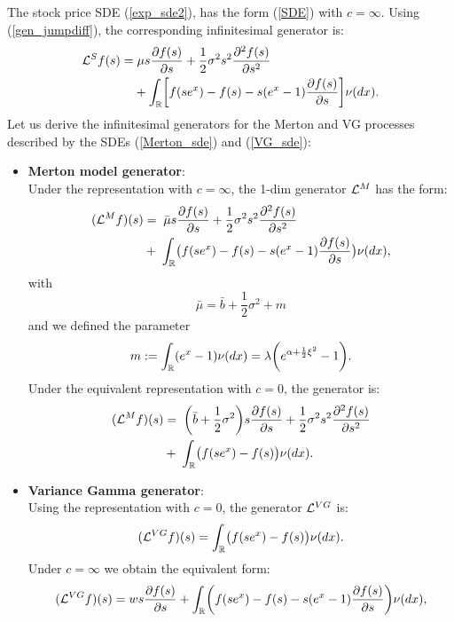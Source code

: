 The stock price SDE (\ref{exp_sde2}), has the form (\ref{SDE}) with $c=\infty$. Using (\ref{gen_jumpdiff}), the corresponding infinitesimal generator is:
\begin{align}\label{inf_gen_exp_levy}
 \mathcal{L}^S f(s) =& \; \mu s \frac{\partial f(s)}{\partial s}
+ \frac{1}{2} \sigma^2 s^2 \frac{\partial^2  f(s)}{\partial s^2}  \\ \nonumber
&+ \int_{\mathbb{R}} \biggl[ f(se^x) - f(s) - s(e^x-1)\frac{\partial f(s)}{\partial s} \biggr] \nu(dx).
\end{align}
Let us derive the infinitesimal generators for 
the Merton and VG processes described by the SDEs (\ref{Merton_sde}) and (\ref{VG_sde}): \\
\begin{itemize}
 \item \textbf{Merton model generator}:\\
 Under the representation with $c=\infty$, the 1-dim generator $\mathcal{L}^{M}$ has the form:  
 \begin{align}\label{Merton_gen}
  (\mathcal{L}^{M} f)(s)  &= \;  \bar \mu s \frac{\partial f(s)}{\partial s} + \frac{1}{2} \sigma^2 s^2 \frac{\partial^2 f(s)}{\partial s^2} \\ \nonumber
  &+ \; \int_{\mathbb{R}} \bigl( f(s e^x) - f(s) - s(e^x-1)\frac{\partial f(s)}{\partial s} \bigr) \nu(dx), 
 \end{align}
with $$ \bar \mu = \bar b + \frac{1}{2}\sigma^2 + m $$
and we defined the parameter 
\begin{equation}\label{parameter_m} 
 m := \int_{\mathbb{R}} ( e^{x} - 1 ) \nu(dx) = \lambda \biggl( e^{\alpha + \frac{1}{2} \xi^2} -1 \biggr).
\end{equation}
Under the equivalent representation with $c=0$, the generator is:
 \begin{align}\label{Merton_gen}
  (\mathcal{L}^{M} f)(s)  &= \; \biggl( \bar b + \frac{1}{2}\sigma^2 \biggr)s \frac{\partial f(s)}{\partial s} 
                  + \frac{1}{2} \sigma^2 s^2 \frac{\partial^2 f(s)}{\partial s^2} \\ \nonumber
  &+ \; \int_{\mathbb{R}} \bigl( f(se^x) - f(s) \bigr) \nu(dx). 
 \end{align}
 \item \textbf{Variance Gamma generator}:\\
 Using the representation with $c = 0$, the generator $\mathcal{L}^{VG}$ is:
 \begin{equation}\label{VG_gen}
  (\mathcal{L}^{VG} f)(s) = \int_{\mathbb{R}} \bigl( f(se^x) - f(s) \bigr) \nu(dx).
 \end{equation}
 \newline
 Under $c = \infty$ we obtain the equivalent form: 
 \begin{equation}
  (\mathcal{L}^{VG} f)(s) = w s \frac{\partial f(s)}{\partial s} 
  + \int_{\mathbb{R}} \biggl( f(s e^x) - f(s) - s(e^x-1)\frac{\partial f(s)}{\partial s} \biggr) \nu(dx),
 \end{equation}
\end{itemize}
